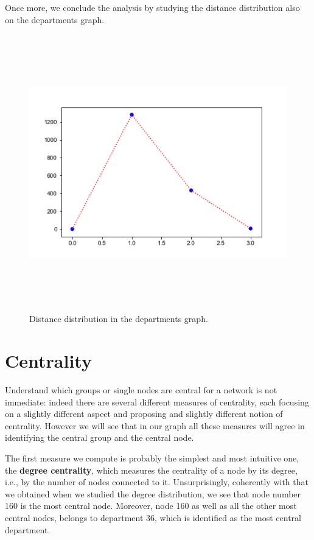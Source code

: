 \documentclass{report}
\theoremstyle{definition}
\theoremstyle{remark}
\begin{document}
Once more, we conclude the analysis by studying the distance distribution also on the departments graph.
\begin{figure} [H]
	\centering
	\centerline{\includegraphics[width = 13cm, height = 12cm, keepaspectratio]{DEP_distance_distribution.png}}
	\label{Dist_dep}
	\caption{Distance distribution in the departments graph.}
\end{figure}
\section*{Centrality}
Understand which groups or single nodes are central for a network is not immediate: indeed there are several different measures of centrality, each focusing on a slightly different aspect and proposing and slightly different notion of centrality. However we will see that in our graph all these measures will agree in identifying the central group and the central node.

The first measure we compute is probably the simplest and most intuitive one, the \textbf{degree centrality}, which measures the centrality of a node by its degree, i.e., by the number of nodes connected to it. Unsurprisingly, coherently with that we obtained when we studied the degree distribution, we see that node number 160 is the most central node. Moreover, node 160 as well as all the other most central nodes, belongs to department 36, which is identified as the most central department.
\end{document}
